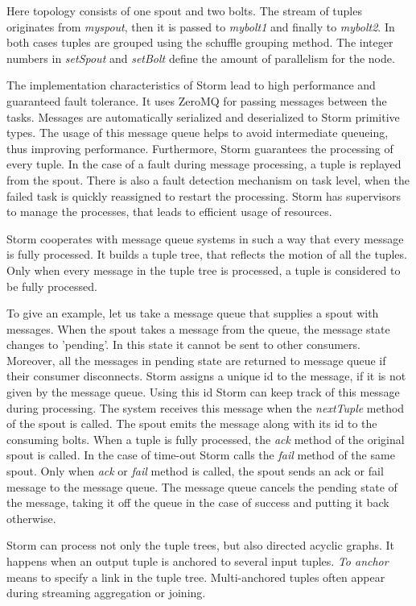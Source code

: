 Here topology consists of one spout and two bolts.
The stream of tuples originates from \textit{myspout}, then it is passed to \textit{mybolt1} and finally to \textit{mybolt2}.
In both cases tuples are grouped using the schuffle grouping method.
The integer numbers in \textit{setSpout} and \textit{setBolt} define the amount of parallelism for the node.

The implementation characteristics of Storm lead to high performance and guaranteed fault tolerance.
It uses ZeroMQ for passing messages between the tasks.
Messages are automatically serialized and deserialized to Storm primitive types.
The usage of this message queue helps to avoid intermediate queueing, thus improving performance.
Furthermore, Storm guarantees the processing of every tuple.
In the case of a fault during message processing, a tuple is replayed from the spout.
There is also a fault detection mechanism on task level, when the failed task is quickly reassigned to restart the processing.
Storm has supervisors to manage the processes, that leads to efficient usage of resources.

Storm cooperates with message queue systems in such a way that every message is fully processed.
It builds a tuple tree, that reflects the motion of all the tuples.
Only when every message in the tuple tree is processed, a tuple is considered to be fully processed.

To give an example, let us take a message queue that supplies a spout with messages.
When the spout takes a message from the queue, the message state changes to 'pending'.
In this state it cannot be sent to other consumers.
Moreover, all the messages in pending state are returned to message queue if their consumer disconnects.
Storm assigns a unique id to the message, if it is not given by the message queue.
Using this id Storm can keep track of this message during processing.
The system receives this message when the \textit{nextTuple} method of the spout is called.
The spout emits the message along with its id to the consuming bolts.
When a tuple is fully processed, the \textit{ack} method of the original spout is called. 
In the case of time-out Storm calls the \textit{fail} method of the same spout.
Only when \textit{ack} or \textit{fail} method is called, the spout sends an ack or fail message to the message queue.
The message queue cancels the pending state of the message, taking it off the queue in the case of success and putting it back otherwise.

Storm can process not only the tuple trees, but also directed acyclic graphs.
It happens when an output tuple is anchored to several input tuples.
\textit{To anchor} means to specify a link in the tuple tree.
Multi-anchored tuples often appear during streaming aggregation or joining.
 
